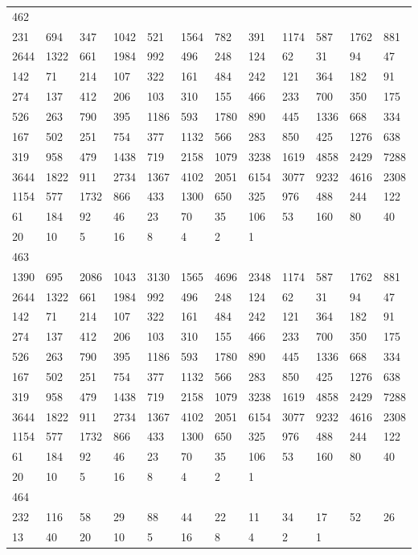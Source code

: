 \begin{longtable}{llllllllllll}
462&&&&&&&&&&&\\
231& 694& 347& 1042& 521& 1564& 782& 391& 1174& 587& 1762& 881\\
2644& 1322& 661& 1984& 992& 496& 248& 124& 62& 31& 94& 47\\
142& 71& 214& 107& 322& 161& 484& 242& 121& 364& 182& 91\\
274& 137& 412& 206& 103& 310& 155& 466& 233& 700& 350& 175\\
526& 263& 790& 395& 1186& 593& 1780& 890& 445& 1336& 668& 334\\
167& 502& 251& 754& 377& 1132& 566& 283& 850& 425& 1276& 638\\
319& 958& 479& 1438& 719& 2158& 1079& 3238& 1619& 4858& 2429& 7288\\
3644& 1822& 911& 2734& 1367& 4102& 2051& 6154& 3077& 9232& 4616& 2308\\
1154& 577& 1732& 866& 433& 1300& 650& 325& 976& 488& 244& 122\\
61& 184& 92& 46& 23& 70& 35& 106& 53& 160& 80& 40\\
20& 10& 5& 16& 8& 4& 2& 1& \\

463&&&&&&&&&&&\\
1390& 695& 2086& 1043& 3130& 1565& 4696& 2348& 1174& 587& 1762& 881\\
2644& 1322& 661& 1984& 992& 496& 248& 124& 62& 31& 94& 47\\
142& 71& 214& 107& 322& 161& 484& 242& 121& 364& 182& 91\\
274& 137& 412& 206& 103& 310& 155& 466& 233& 700& 350& 175\\
526& 263& 790& 395& 1186& 593& 1780& 890& 445& 1336& 668& 334\\
167& 502& 251& 754& 377& 1132& 566& 283& 850& 425& 1276& 638\\
319& 958& 479& 1438& 719& 2158& 1079& 3238& 1619& 4858& 2429& 7288\\
3644& 1822& 911& 2734& 1367& 4102& 2051& 6154& 3077& 9232& 4616& 2308\\
1154& 577& 1732& 866& 433& 1300& 650& 325& 976& 488& 244& 122\\
61& 184& 92& 46& 23& 70& 35& 106& 53& 160& 80& 40\\
20& 10& 5& 16& 8& 4& 2& 1& \\

464&&&&&&&&&&&\\
232& 116& 58& 29& 88& 44& 22& 11& 34& 17& 52& 26\\
13& 40& 20& 10& 5& 16& 8& 4& 2& 1& \\


\end{longtable}
